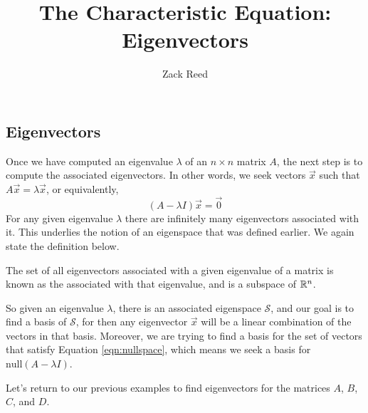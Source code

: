 \documentclass{ximera}
\author{Zack Reed}
\title{The Characteristic Equation: Eigenvectors}
\begin{document}
\begin{abstract}

\end{abstract}
\maketitle

    
\subsection*{Eigenvectors}
Once we have computed an eigenvalue $\lambda$ of an $n \times n$ matrix $A$, the next step is to compute the associated eigenvectors.  In other words, we seek vectors $\vec{x}$ such that $A\vec{x}=\lambda \vec{x}$, or equivalently,
\begin{equation}\label{eqn:nullspace}
    (A-\lambda I) \vec{x}=\vec{0}  
\end{equation}
For any given eigenvalue $\lambda$ there are infinitely many eigenvectors associated with it. This underlies the notion of an eigenspace that was defined earlier. We again state the definition below.

    
\begin{definition}\label{def:eigspace}
The set of all eigenvectors associated with a given eigenvalue of a matrix is known as the  associated with that eigenvalue, and is a subspace of $\mathbb{R}^n$.
\end{definition}
    
So given an eigenvalue $\lambda$, there is an associated eigenspace $\mathcal{S}$, and our goal is to find a basis of $\mathcal{S}$, for then any eigenvector $\vec{x}$ will be a linear combination of the vectors in that basis.  Moreover, we are trying to find a basis for the set of vectors that satisfy Equation \ref{eqn:nullspace}, which means we seek a basis for $\mbox{null}(A-\lambda I)$. 
    
Let's return to our previous examples to find eigenvectors for the matrices $A$, $B$, $C$, and $D$.
    
\end{document}
